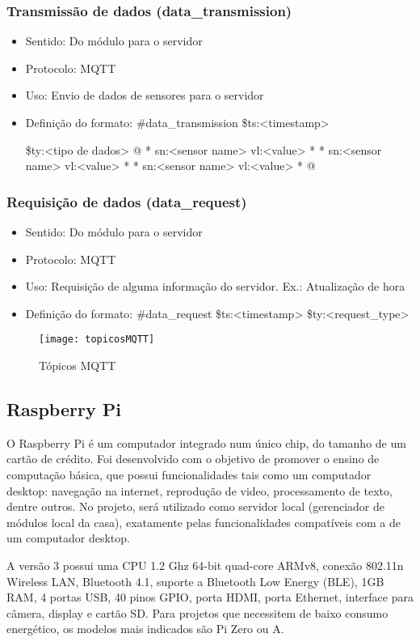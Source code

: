 \subsubsection{Transmissão de dados (data_transmission)}
\begin{itemize}
\item Sentido: Do módulo para o servidor
\item Protocolo: MQTT
\item Uso: Envio de dados de sensores para o servidor
\item Definição do formato:
#data_transmission
\$ts:<timestamp>

\$ty:<tipo de dados>
@
*
sn:<sensor name>
vl:<value>
*
*
sn:<sensor name>
vl:<value>
*
*
sn:<sensor name>
vl:<value>
*
@
\end{itemize}

\subsubsection{Requisição de dados (data_request)}
\begin{itemize}
\item Sentido: Do módulo para o servidor
\item Protocolo: MQTT
\item Uso: Requisição de alguma informação do servidor. Ex.: Atualização de hora
\item Definição do formato:
#data_request
\$ts:<timestamp>
\$ty:<request_type>
\end{itemize}

\begin{figure}[H]
	\centering
\caption{Tópicos MQTT}
  \texttt{[image: topicosMQTT]}
\label{fig:topicosMQTT}
\end{figure}

\subsection{Raspberry Pi}
O Raspberry Pi é um computador integrado num único chip, do tamanho de um cartão de crédito. Foi desenvolvido com o objetivo de promover o ensino de computação básica, que possui funcionalidades tais como um computador desktop: navegação na internet, reprodução de video, processamento de texto, dentre outros. No projeto, será utilizado como servidor local (gerenciador de módulos local da casa), exatamente pelas funcionalidades compatíveis com a de um computador desktop.

A versão 3 possui uma CPU 1.2 Ghz 64-bit quad-core ARMv8, conexão 802.11n Wireless LAN, Bluetooth 4.1, suporte a Bluetooth Low Energy (BLE), 1GB RAM, 4 portas USB, 40 pinos GPIO, porta HDMI, porta Ethernet, interface para câmera, display e cartão SD. Para projetos que necessitem de baixo consumo energético, os modelos mais indicados são Pi Zero ou A.

